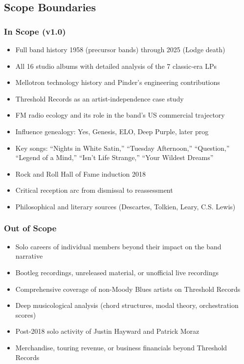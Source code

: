 \documentclass[11pt,letterpaper]{article}
\begin{document}
\subsection{Scope Boundaries}

\subsubsection{In Scope (v1.0)}

\begin{itemize}[leftmargin=*]
  \item Full band history 1958 (precursor bands) through 2025 (Lodge death)
  \item All 16 studio albums with detailed analysis of the 7 classic-era LPs
  \item Mellotron technology history and Pinder's engineering contributions
  \item Threshold Records as an artist-independence case study
  \item FM radio ecology and its role in the band's US commercial trajectory
  \item Influence genealogy: Yes, Genesis, ELO, Deep Purple, later prog
  \item Key songs: ``Nights in White Satin,'' ``Tuesday Afternoon,'' ``Question,'' ``Legend of a Mind,'' ``Isn't Life Strange,'' ``Your Wildest Dreams''
  \item Rock and Roll Hall of Fame induction 2018
  \item Critical reception arc from dismissal to reassessment
  \item Philosophical and literary sources (Descartes, Tolkien, Leary, C.S. Lewis)
\end{itemize}

\subsubsection{Out of Scope}

\begin{itemize}[leftmargin=*]
  \item Solo careers of individual members beyond their impact on the band narrative
  \item Bootleg recordings, unreleased material, or unofficial live recordings
  \item Comprehensive coverage of non-Moody Blues artists on Threshold Records
  \item Deep musicological analysis (chord structures, modal theory, orchestration scores)
  \item Post-2018 solo activity of Justin Hayward and Patrick Moraz
  \item Merchandise, touring revenue, or business financials beyond Threshold Records
\end{itemize}
\end{document}
